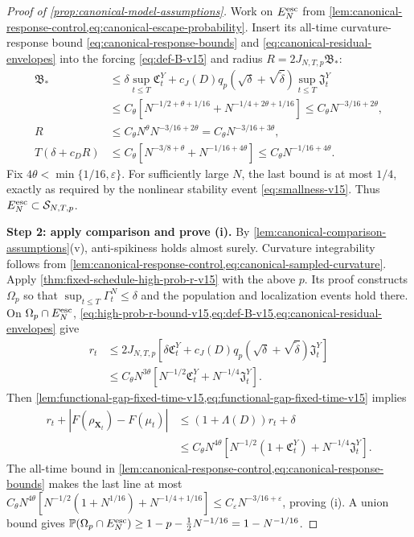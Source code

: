 \begin{proof}[Proof of \cref{prop:canonical-model-assumptions}]
Work on $E_N^{\rm esc}$ from
\cref{lem:canonical-response-control,eq:canonical-escape-probability}.
Insert its all-time curvature-response bound \eqref{eq:canonical-response-bounds}
and \eqref{eq:canonical-residual-envelopes} into the forcing
\eqref{eq:def-B-v15} and radius $R=2J_{N,T,p}\mathfrak B_*$:
\[
 \begin{aligned}
 \mathfrak B_*
 &\le\delta\sup_{t\le T}\mathfrak C_t^Y
       +c_J(D)q_p(\sqrt\delta+\sqrt{\widetilde\delta})
                          \sup_{t\le T}\mathfrak J_t^Y\\
 &\le C_\theta\left[N^{-1/2+\theta+1/16}
                    +N^{-1/4+2\theta+1/16}\right]
 \le C_\theta N^{-3/16+2\theta},\\
 R&\le C_\theta N^\theta N^{-3/16+2\theta}
       =C_\theta N^{-3/16+3\theta},\\
 T(\delta+c_DR)
 &\le C_\theta\left[N^{-3/8+\theta}+N^{-1/16+4\theta}\right]
 \le C_\theta N^{-1/16+4\theta}.
 \end{aligned}
\]
Fix $4\theta<\min\{1/16,\varepsilon\}$.
For sufficiently large $N$, the last bound is at most $1/4$, exactly
as required by the nonlinear stability event \eqref{eq:smallness-v15}.
Thus $E_N^{\rm esc}\subset\mathcal S_{N,T,p}$.

\par\noindent\textbf{Step 2: apply comparison and prove (i).}
By \cref{lem:canonical-comparison-assumptions}(v), anti-spikiness holds
almost surely. Curvature integrability follows from
\cref{lem:canonical-response-control,eq:canonical-sampled-curvature}.
Apply \cref{thm:fixed-schedule-high-prob-r-v15} with the above $p$.
Its proof constructs $\Omega_p$ so that $\sup_{t\le T}\Gamma_t^N\le\delta$
and the population and localization events hold there.
On $\Omega_p\cap E_N^{\rm esc}$,
\cref{eq:high-prob-r-bound-v15,eq:def-B-v15,eq:canonical-residual-envelopes}
give
\[
 \begin{aligned}
 r_t&\le2J_{N,T,p}
       [\delta\mathfrak C_t^Y
        +c_J(D)q_p(\sqrt\delta+\sqrt{\widetilde\delta})\mathfrak J_t^Y]\\
 &\le C_\theta N^{3\theta}
       [N^{-1/2}\mathfrak C_t^Y+N^{-1/4}\mathfrak J_t^Y].
 \end{aligned}
\]
Then \cref{lem:functional-gap-fixed-time-v15,eq:functional-gap-fixed-time-v15}
implies
\begin{equation}
 \begin{split}
 r_t+|F(\rho_{\mathbf X_t})-F(\mu_t)|
 &\le(1+\Lambda(D))r_t+\delta\\
 &\le C_\theta N^{4\theta}
       [N^{-1/2}(1+\mathfrak C_t^Y)+N^{-1/4}\mathfrak J_t^Y].
 \end{split}
 \label{eq:canonical-response-tracking}
\end{equation}
The all-time bound in
\cref{lem:canonical-response-control,eq:canonical-response-bounds}
makes the last line at most
$C_\theta N^{4\theta}[N^{-1/2}(1+N^{1/16})+N^{-1/4+1/16}]
\le C_\varepsilon N^{-3/16+\varepsilon}$, proving (i).
A union bound gives
$\mathbb P(\Omega_p\cap E_N^{\rm esc})
\ge1-p-\tfrac12N^{-1/16}=1-N^{-1/16}$.


\end{proof}
